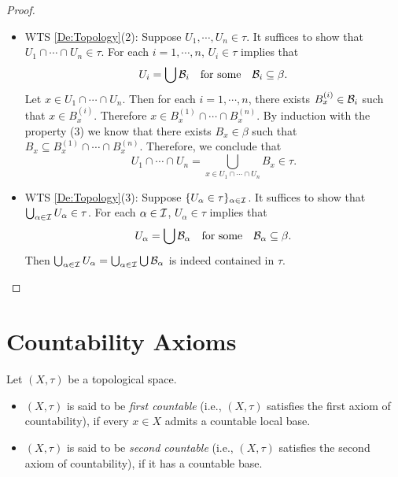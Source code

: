 \documentclass[screen]{techreport}
\numberwithin{equation}{section}
\begin{document}
\begin{proof}
\begin{itemize}
\begin{itemize}
			\item WTS \cref{De:Topology}(2):
			Suppose $U_1,\cdots,U_n \in \tau$.
			It suffices to show that $U_1 \cap \cdots \cap U_n \in \tau$.
			For each $i=1,\cdots,n$, $U_i \in \tau$ implies that
			\[
			U_i = \bigcup \mathcal{B}_i \quad \text{for some} \quad \mathcal{B}_i \subseteq \beta.
			\]
			Let $x \in U_1 \cap \cdots \cap U_n$.
			Then for each $i=1,\cdots,n$, there exists $B_x^{(i)} \in \mathcal{B}_i$ such that $x \in B_x^{(i)}$.
			Therefore $x \in B_x^{(1)} \cap \cdots \cap B_x^{(n)}$.
			By induction with the property (3) we know that there exists $B_x \in \beta$ such that $B_x \subseteq B_x^{(1)} \cap \cdots \cap B_x^{(n)}$.
			Therefore, we conclude that
			\[
			U_1 \cap \cdots \cap U_n = \bigcup_{x \in U_1 \cap \cdots \cap U_n} B_x \in \tau.
			\]
			
			\item WTS \cref{De:Topology}(3):
			Suppose $\{U_\alpha \in \tau\}_{\alpha \in \mathcal{I}}$.
			It suffices to show that $\bigcup_{\alpha \in \mathcal{I}} U_\alpha \in \tau$.
			For each $\alpha \in \mathcal{I}$, $U_\alpha \in \tau$ implies that
			\[
			U_\alpha = \bigcup \mathcal{B}_\alpha \quad \text{for some} \quad \mathcal{B}_\alpha \subseteq \beta.
			\]
			Then $\bigcup_{\alpha \in \mathcal{I}} U_\alpha = \bigcup_{\alpha \in \mathcal{I}} \bigcup \mathcal{B}_\alpha$ is indeed contained in $\tau$.
		\end{itemize}
	\end{itemize}
\end{proof}

\section{Countability Axioms}

\begin{definition}\label{De:AxiomsOfCountability}
	Let $(X,\tau)$ be a topological space.
	\begin{itemize}
		\item $(X,\tau)$ is said to be \emph{first countable} (i.e., $(X,\tau)$ satisfies the first axiom of countability), if every $x \in X$ admits a countable local base.
		\item $(X,\tau)$ is said to be \emph{second countable} (i.e., $(X,\tau)$ satisfies the second axiom of countability), if it has a countable base.
	\end{itemize}
\end{definition}
\end{document}
